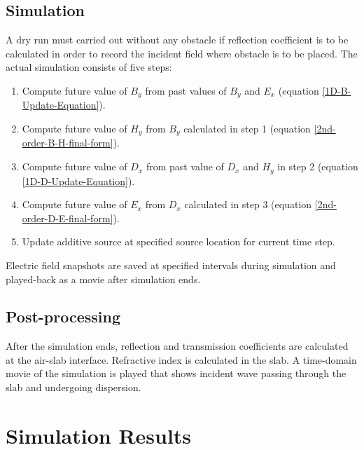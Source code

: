 \subsection{Simulation}
A dry run must carried out without any obstacle if reflection coefficient is to be calculated in order to record the incident field where obstacle is to be placed. The actual simulation consists of five steps:
\begin{enumerate}
\item Compute future value of $B_y$ from past values of $B_y$ and $E_x$ (equation \ref{1D-B-Update-Equation}).
\item Compute future value of $H_y$ from $B_y$ calculated in step 1 (equation \ref{2nd-order-B-H-final-form}).
\item Compute future value of $D_x$ from past value of $D_x$ and $H_y$ in step 2 (equation \ref{1D-D-Update-Equation}).
\item Compute future value of $E_x$ from $D_x$ calculated in step 3 (equation \ref{2nd-order-D-E-final-form}).
\item Update additive source at specified source location for current time step.
\end{enumerate}
Electric field snapshots are saved at specified intervals during simulation and played-back as a movie after simulation ends. 
\subsection{Post-processing}
After the simulation ends, reflection and transmission coefficients are calculated at the air-slab interface. Refractive index is calculated in the slab. A time-domain movie of the simulation is played that shows incident wave passing through the slab and undergoing dispersion.
\section{Simulation Results}

